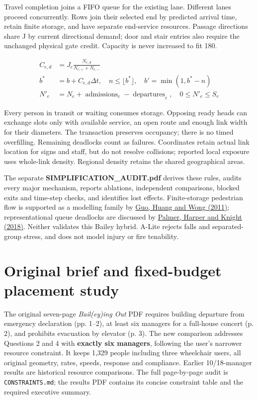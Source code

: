 \documentclass[11pt,a4paper]{article}
\newcommand{\code}[1]{{\small\nolinkurl{#1}}}
\begin{document}
Travel completion joins a FIFO queue for the existing lane. Different lanes proceed concurrently. Rows join their selected end by predicted arrival time, retain finite storage, and have separate end-service resources. Passage directions share J by current directional demand; door and stair entries also require the unchanged physical gate credit. Capacity is never increased to fit 180.


\begin{equation}
\begin{aligned}
C_{e,d}&=J_e\frac{N_{e,d}}{N_{e,+}+N_{e,-}} \\
b^*&=b+C_{e,d}\Delta t,\quad n\le\lfloor b^*\rfloor,\quad b'=\min(1,b^*-n) \\
N'_e&=N_e+\operatorname{admissions}_e-\operatorname{departures}_e,\quad0\le N'_e\le S_e
\end{aligned}
\tag{24}\label{eq:24}
\end{equation}

Every person in transit or waiting consumes storage. Opposing ready heads can exchange slots only with available service, an open route and enough link width for their diameters. The transaction preserves occupancy; there is no timed overfilling. Remaining deadlocks count as failures. Coordinates retain actual link location for signs and staff, but do not resolve collisions; reported local exposure uses whole-link density. Regional density retains the shared geographical areas.


The separate \textbf{SIMPLIFICATION\_AUDIT.pdf} derives these rules, audits every major mechanism, reports ablations, independent comparisons, blocked exits and time-step checks, and identifies lost effects. Finite-storage pedestrian flow is supported as a modelling family by \href{https://doi.org/10.1016/j.trb.2010.09.009}{Guo, Huang and Wong (2011)}; representational queue deadlocks are discussed by \href{https://doi.org/10.1016/j.ejor.2017.10.039}{Palmer, Harper and Knight (2018)}. Neither validates this Bailey hybrid. A-Lite rejects falls and separated-group stress, and does not model injury or fire tenability.


\section{Original brief and fixed-budget placement study}\label{sec:20}

The original seven-page \emph{Bail(ey)ing Out} PDF requires building departure from emergency declaration (pp. 1–2), at least six managers for a full-house concert (p. 2), and prohibits evacuation by elevator (p. 3). The new comparison addresses Questions 2 and 4 with \textbf{exactly six managers}, following the user's narrower resource constraint. It keeps 1,329 people including three wheelchair users, all original geometry, rates, speeds, response and compliance. Earlier 10/18-manager results are historical resource comparisons. The full page-by-page audit is \code{CONSTRAINTS.md}; the results PDF contains its concise constraint table and the required executive summary.
\end{document}
